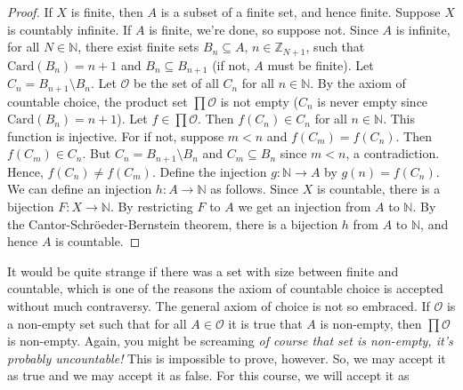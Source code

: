 \documentclass{article}
\theoremstyle{plain}
\theoremstyle{normal}
\newenvironment{axiom}{%
    \pushQED{\qed}\renewcommand{\qedsymbol}{$\blacksquare$}\axiomx%
}{%
    \popQED\endaxiomx%
}
\begin{document}
        \begin{proof}
            If $X$ is finite, then $A$ is a subset of a finite set, and hence
            finite. Suppose $X$ is countably infinite. If $A$ is finite, we're
            done, so suppose not. Since $A$ is infinite, for all
            $N\in\mathbb{N}$, there exist finite sets $B_{n}\subseteq{A}$,
            $n\in\mathbb{Z}_{N+1}$, such that $\textrm{Card}(B_{n})=n+1$
            and $B_{n}\subseteq{B}_{n+1}$ (if not, $A$ must be finite).
            Let $C_{n}=B_{n+1}\setminus{B}_{n}$. Let
            $\mathcal{O}$ be the set of all $C_{n}$ for all $n\in\mathbb{N}$.
            By the axiom of countable choice, the product set
            $\prod\mathcal{O}$ is not empty ($C_{n}$ is never empty since
            $\textrm{Card}(B_{n})=n+1$). Let $f\in\prod\mathcal{O}$.
            Then $f(C_{n})\in{C}_{n}$ for all $n\in\mathbb{N}$. This function
            is injective. For if not, suppose $m<n$ and
            $f(C_{m})=f(C_{n})$. Then $f(C_{m})\in{C}_{n}$. But
            $C_{n}=B_{n+1}\setminus{B}_{n}$ and
            $C_{m}\subseteq{B}_{n}$ since $m<n$, a
            contradiction. Hence, $f(C_{n})\ne{f}(C_{m})$. Define the injection
            $g:\mathbb{N}\rightarrow{A}$ by $g(n)=f(C_{n})$. We can define an
            injection $h:A\rightarrow\mathbb{N}$ as follows. Since $X$ is
            countable, there is a bijection $F:X\rightarrow\mathbb{N}$.
            By restricting $F$ to $A$ we get an injection from
            $A$ to $\mathbb{N}$. By the Cantor-Schr\"{o}eder-Bernstein theorem,
            there is a bijection $h$ from $A$ to $\mathbb{N}$, and hence
            $A$ is countable.
        \end{proof}
        It would be quite strange if there was a set with size between
        finite and countable, which is one of the reasons the axiom of
        countable choice is accepted without much contraversy. The general
        axiom of choice is not so embraced.
        \begin{axiom}[\textbf{Axiom of Choice}]
            If $\mathcal{O}$ is a non-empty set such that for all
            $A\in\mathcal{O}$ it is true that $A$ is non-empty, then
            $\prod\mathcal{O}$ is non-empty.
        \end{axiom}
        Again, you might be screaming
        \textit{of course that set is non-empty, it's probably uncountable!}
        This is impossible to prove, however. So, we may accept it as true
        and we may accept it as false. For this course, we will accept it as
\end{document}
